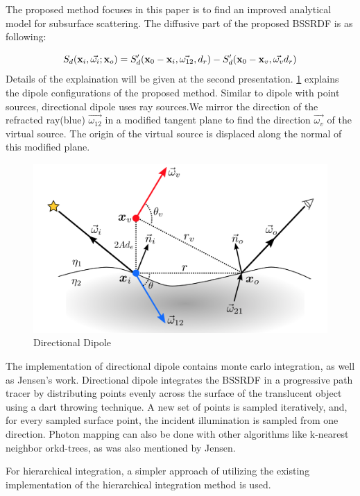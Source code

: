 \documentclass[12pt]{article}
\begin{document}
The proposed method  focuses in this paper is to find an improved
analytical model for subsurface scattering. 
The diffusive part of the
proposed BSSRDF is as following:


$$
S_d({\bf x}_i, \vec{\omega_i}; {\bf x}_o)  = S'_d({\bf x}_0 - {\bf x}_i,
\vec{\omega_{12}}, d_r) - S'_d({\bf x}_0 - {\bf x}_v, \vec{\omega_v}
d_r)
$$
Details of the explaination will be given at the second
presentation. \ref{fig:directional} explains the dipole configurations of
the proposed method. Similar to dipole with point sources, directional
dipole uses ray sources.We mirror the direction of the refracted
ray(blue) $\vec{\omega_{12}}$ in a modified tangent
plane to find the direction $\vec{\omega_v}$ of the virtual source.
The origin of the virtual source is displaced along the normal of this modified plane.

\begin{figure}[!ht]
  \centering
  \includegraphics[scale=0.2]{direct.png}
  \caption{Directional Dipole}
  \label{fig:directional}
\end{figure}

The implementation of directional dipole contains monte carlo
integration, as well as Jensen's work. Directional dipole  integrates
the BSSRDF in a progressive path tracer by distributing points evenly
across the surface of the translucent object using a dart throwing
technique. A new set of points is sampled iteratively, and, for every
sampled surface point, the incident illumination is sampled from one
direction. Photon mapping can also be done with other algorithms
like k-nearest neighbor orkd-trees, as was also mentioned by Jensen.

For hierarchical integration,
  a simpler approach of utilizing the existing
implementation of the hierarchical integration method is used.


{}


\end{document}
